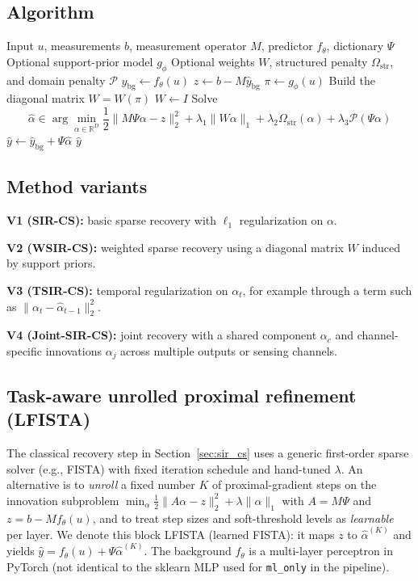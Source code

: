 \subsection{Algorithm}
\begin{algorithm}
\caption{SIR-CS inference}
\label{alg:sir_cs}
\begin{algorithmic}[1]
\Require Input $u$, measurements $b$, measurement operator $M$, predictor $f_\theta$, dictionary $\Psi$
\Require Optional support-prior model $g_\phi$
\Require Optional weights $W$, structured penalty $\Omega_{\mathrm{str}}$, and domain penalty $\mathcal{P}$
\State $\hat{y}_{\mathrm{bg}} \gets f_\theta(u)$
\State $z \gets b - M\hat{y}_{\mathrm{bg}}$
  \State $\pi \gets g_\phi(u)$
  \State Build the diagonal matrix $W = W(\pi)$
\Else
  \State $W \gets I$
\EndIf
\State Solve
\[
  \hat{\alpha}
  \in
  \arg\min_{\alpha \in \mathbb{R}^D}
  \frac{1}{2}\|M\Psi\alpha - z\|_2^2
  + \lambda_1 \|W\alpha\|_1
  + \lambda_2 \Omega_{\mathrm{str}}(\alpha)
  + \lambda_3 \mathcal{P}(\Psi\alpha)
\]
\State $\hat{y} \gets \hat{y}_{\mathrm{bg}} + \Psi \hat{\alpha}$
\Ensure $\hat{y}$
\end{algorithmic}
\end{algorithm}

\subsection{Method variants}
\textbf{V1 (SIR-CS):} basic sparse recovery with $\ell_1$ regularization on $\alpha$.

\textbf{V2 (WSIR-CS):} weighted sparse recovery using a diagonal matrix $W$ induced by support priors.

\textbf{V3 (TSIR-CS):} temporal regularization on $\alpha_t$, for example through a term such as
$\|\alpha_t - \hat{\alpha}_{t-1}\|_2^2$.

\textbf{V4 (Joint-SIR-CS):} joint recovery with a shared component $\alpha_c$ and channel-specific innovations $\alpha_j$
across multiple outputs or sensing channels.

\subsection{Task-aware unrolled proximal refinement (LFISTA)}
\label{subsec:lfista_method}

The classical recovery step in Section~\ref{sec:sir_cs} uses a generic first-order sparse solver (e.g., FISTA) with fixed iteration schedule and hand-tuned $\lambda$.
An alternative is to \emph{unroll} a fixed number $K$ of proximal-gradient steps on the innovation subproblem
\(
  \min_{\alpha}\tfrac{1}{2}\|A\alpha-z\|_2^2 + \lambda\|\alpha\|_1
\)
with $A=M\Psi$ and $z=b-M f_\theta(u)$, and to treat step sizes and soft-threshold levels as \emph{learnable} per layer.
We denote this block LFISTA (learned FISTA): it maps $z$ to $\hat{\alpha}^{(K)}$ and yields $\hat{y}=f_\theta(u)+\Psi\hat{\alpha}^{(K)}$.
The background $f_\theta$ is a multi-layer perceptron in PyTorch (not identical to the sklearn MLP used for \texttt{ml\_only} in the pipeline).

